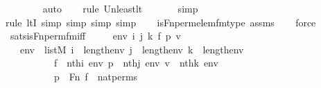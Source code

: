 \begin{isabellebody}
\ \ \ \ \ \ \isamarkupfalse%
\ auto{\isacharbrackleft}{\kern0pt}{}{\isacharbrackright}{\kern0pt}\isanewline
\ \ \ \isamarkupfalse%
{\isacharparenleft}{\kern0pt}rule\ Un{\isacharunderscore}{\kern0pt}least{\isacharunderscore}{\kern0pt}lt{\isacharparenright}{\kern0pt}{\isacharplus}{\kern0pt}\isanewline
\ \ \ \ \ \isamarkupfalse%
\ simp\isanewline
\ \ \ \ \ \isamarkupfalse%
{\isacharparenleft}{\kern0pt}rule\ ltI{\isacharcomma}{\kern0pt}\ simp{\isacharcomma}{\kern0pt}\ simp{\isacharcomma}{\kern0pt}\ simp{\isacharcomma}{\kern0pt}\ simp{\isacharparenright}{\kern0pt}\isanewline
\ \ \isamarkupfalse%
\ is{\isacharunderscore}{\kern0pt}Fn{\isacharunderscore}{\kern0pt}perm{\isacharunderscore}{\kern0pt}elem{\isacharunderscore}{\kern0pt}fm{\isacharunderscore}{\kern0pt}type\ assms\isanewline
\ \ \isamarkupfalse%
\ force%
\endisatagproof
{\isafoldproof}%
%
\isadelimproof
\isanewline
%
\endisadelimproof
\isanewline
{}\isamarkupfalse%
\ sats{\isacharunderscore}{\kern0pt}is{\isacharunderscore}{\kern0pt}Fn{\isacharunderscore}{\kern0pt}perm{\isacharunderscore}{\kern0pt}fm{\isacharunderscore}{\kern0pt}iff\ {\isacharcolon}{\kern0pt}\ \isanewline
\ \ \ env\ i\ j\ k\ f\ p\ v\ \isanewline
\ \ \ {\isachardoublequoteopen}env\ {\isasymin}\ list{\isacharparenleft}{\kern0pt}M{\isacharparenright}{\kern0pt}{\isachardoublequoteclose}\ {\isachardoublequoteopen}i\ {\isacharless}{\kern0pt}\ length{\isacharparenleft}{\kern0pt}env{\isacharparenright}{\kern0pt}{\isachardoublequoteclose}\ {\isachardoublequoteopen}j\ {\isacharless}{\kern0pt}\ length{\isacharparenleft}{\kern0pt}env{\isacharparenright}{\kern0pt}{\isachardoublequoteclose}\ {\isachardoublequoteopen}k\ {\isacharless}{\kern0pt}\ length{\isacharparenleft}{\kern0pt}env{\isacharparenright}{\kern0pt}{\isachardoublequoteclose}\ \isanewline
\ \ \ \ \ \ \ \ \ \ {\isachardoublequoteopen}f\ {\isacharequal}{\kern0pt}\ nth{\isacharparenleft}{\kern0pt}i{\isacharcomma}{\kern0pt}\ env{\isacharparenright}{\kern0pt}{\isachardoublequoteclose}\ {\isachardoublequoteopen}p\ {\isacharequal}{\kern0pt}\ nth{\isacharparenleft}{\kern0pt}j{\isacharcomma}{\kern0pt}\ env{\isacharparenright}{\kern0pt}{\isachardoublequoteclose}\ {\isachardoublequoteopen}v\ {\isacharequal}{\kern0pt}\ nth{\isacharparenleft}{\kern0pt}k{\isacharcomma}{\kern0pt}\ env{\isacharparenright}{\kern0pt}{\isachardoublequoteclose}\ \isanewline
\ \ \ \ \ \ \ \ \ \ {\isachardoublequoteopen}p\ {\isasymin}\ Fn{\isachardoublequoteclose}\ {\isachardoublequoteopen}f\ {\isasymin}\ nat{\isacharunderscore}{\kern0pt}perms{\isachardoublequoteclose}\isanewline

\end{isabellebody}
